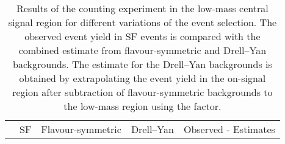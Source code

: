 
\begin{table}[hbtp]
 \renewcommand{\arraystretch}{1.3}
 \setlength{\belowcaptionskip}{6pt}
 \centering
 \caption{Results of the counting experiment in the low-mass central signal region for different variations of the event selection. The observed event yield in SF events is compared with the combined estimate from flavour-symmetric and Drell--Yan backgrounds. The estimate for the Drell--Yan backgrounds is obtained by extrapolating the event yield in the on-\Z signal region after subtraction of flavour-symmetric backgrounds to the low-mass region using the \Routin factor.}
  \label{tab:CountingCrosschecks}
  \begin{tabular}{l|c|c|c|c}
                                &  SF        & Flavour-symmetric  &  Drell--Yan  & Observed - Estimates \\ 


\end{tabular}
\end{table}
